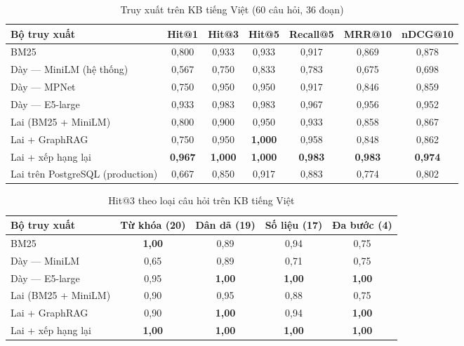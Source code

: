 \begin{table}[H]
\centering
\caption{Truy xuất trên KB tiếng Việt (60 câu hỏi, 36 đoạn)}
\label{tab:ch5-vi}
\small
\begin{adjustbox}{max width=\linewidth}
\begin{tabular}{@{}lcccccc@{}}
\toprule
\textbf{Bộ truy xuất} & \textbf{Hit@1} & \textbf{Hit@3} & \textbf{Hit@5} & \textbf{Recall@5} & \textbf{MRR@10} & \textbf{nDCG@10} \\
\midrule
BM25 & 0,800 & 0,933 & 0,933 & 0,917 & 0,869 & 0,878 \\
Dày — MiniLM (hệ thống) & 0,567 & 0,750 & 0,833 & 0,783 & 0,675 & 0,698 \\
Dày — MPNet & 0,750 & 0,950 & 0,950 & 0,917 & 0,846 & 0,859 \\
Dày — E5-large & 0,933 & 0,983 & 0,983 & 0,967 & 0,956 & 0,952 \\
Lai (BM25 + MiniLM) & 0,800 & 0,900 & 0,950 & 0,933 & 0,858 & 0,867 \\
Lai + GraphRAG & 0,750 & 0,950 & \textbf{1,000} & 0,958 & 0,848 & 0,862 \\
Lai + xếp hạng lại & \textbf{0,967} & \textbf{1,000} & \textbf{1,000} & \textbf{0,983} & \textbf{0,983} & \textbf{0,974} \\
Lai trên PostgreSQL (production) & 0,667 & 0,850 & 0,917 & 0,883 & 0,774 & 0,802 \\
\bottomrule
\end{tabular}
\end{adjustbox}
\end{table}

\begin{table}[H]
\centering
\caption{Hit@3 theo loại câu hỏi trên KB tiếng Việt}
\label{tab:ch5-type}
\small
\begin{adjustbox}{max width=\linewidth}
\begin{tabular}{@{}lcccc@{}}
\toprule
\textbf{Bộ truy xuất} & \textbf{Từ khóa (20)} & \textbf{Dân dã (19)} & \textbf{Số liệu (17)} & \textbf{Đa bước (4)} \\
\midrule
BM25 & \textbf{1,00} & 0,89 & 0,94 & 0,75 \\
Dày — MiniLM & 0,65 & 0,89 & 0,71 & 0,75 \\
Dày — E5-large & 0,95 & \textbf{1,00} & \textbf{1,00} & \textbf{1,00} \\
Lai (BM25 + MiniLM) & 0,90 & 0,95 & 0,88 & 0,75 \\
Lai + GraphRAG & 0,90 & \textbf{1,00} & 0,94 & \textbf{1,00} \\
Lai + xếp hạng lại & \textbf{1,00} & \textbf{1,00} & \textbf{1,00} & \textbf{1,00} \\
\bottomrule
\end{tabular}
\end{adjustbox}
\end{table}

